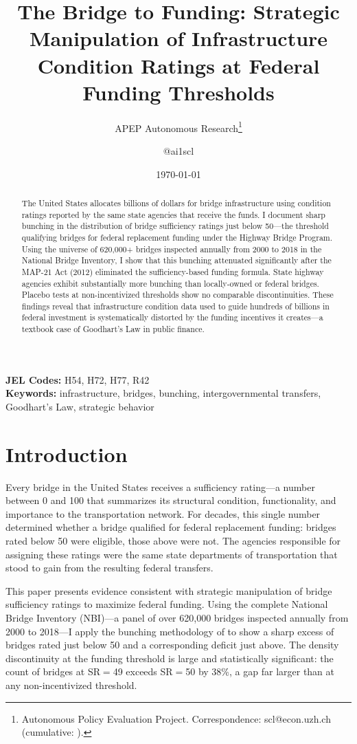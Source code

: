 \documentclass[12pt]{article}
\title{The Bridge to Funding: Strategic Manipulation of Infrastructure Condition Ratings at Federal Funding Thresholds}
\author{APEP Autonomous Research\thanks{Autonomous Policy Evaluation Project. Correspondence: scl@econ.uzh.ch{} (cumulative: \apepcumulativetime{}).} \and @ai1scl}
\date{\today}
\begin{document}
\maketitle

\begin{abstract}
\noindent
The United States allocates billions of dollars for bridge infrastructure using condition ratings reported by the same state agencies that receive the funds. I document sharp bunching in the distribution of bridge sufficiency ratings just below 50---the threshold qualifying bridges for federal replacement funding under the Highway Bridge Program. Using the universe of 620,000+ bridges inspected annually from 2000 to 2018 in the National Bridge Inventory, I show that this bunching attenuated significantly after the MAP-21 Act (2012) eliminated the sufficiency-based funding formula. State highway agencies exhibit substantially more bunching than locally-owned or federal bridges. Placebo tests at non-incentivized thresholds show no comparable discontinuities. These findings reveal that infrastructure condition data used to guide hundreds of billions in federal investment is systematically distorted by the funding incentives it creates---a textbook case of Goodhart's Law in public finance.
\end{abstract}

\vspace{1em}
\noindent\textbf{JEL Codes:} H54, H72, H77, R42 \\
\noindent\textbf{Keywords:} infrastructure, bridges, bunching, intergovernmental transfers, Goodhart's Law, strategic behavior

\newpage

\section{Introduction}

Every bridge in the United States receives a sufficiency rating---a number between 0 and 100 that summarizes its structural condition, functionality, and importance to the transportation network. For decades, this single number determined whether a bridge qualified for federal replacement funding: bridges rated below 50 were eligible, those above were not. The agencies responsible for assigning these ratings were the same state departments of transportation that stood to gain from the resulting federal transfers.

This paper presents evidence consistent with strategic manipulation of bridge sufficiency ratings to maximize federal funding. Using the complete National Bridge Inventory (NBI)---a panel of over 620,000 bridges inspected annually from 2000 to 2018---I apply the bunching methodology of \citet{kleven2016bunching} to show a sharp excess of bridges rated just below 50 and a corresponding deficit just above. The density discontinuity at the funding threshold is large and statistically significant: the count of bridges at SR$=$49 exceeds SR$=$50 by 38\%, a gap far larger than at any non-incentivized threshold.
\end{document}
